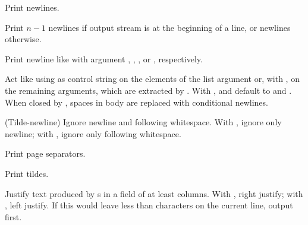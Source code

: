 \begin{LIST}{1cm}
\begin{LIST}{.5cm}
    {
    Print  newlines.
  }

    {
    Print $n-1$ newlines if output stream is at the
    beginning of a line, or  newlines otherwise.
  }

    {
    Print newline like  with argument
    , , , or , respectively.
  }

  {
  Act like  using  as 
  control string on the elements of the list argument or, with ,
  on the remaining arguments, which are extracted by
  . With \KWD{:},  and 
  default to \LIT{(} and \LIT{)}. When closed by
  , spaces in body are replaced with
  conditional newlines. 
  }

    {
    (Tilde-newline) Ignore newline and following
    whitespace. With \kwd{:}, ignore only newline; with ,
    ignore only following whitespace.
  }

    {
    Print  page separators.
  }

    {
    Print  tildes.
  }

    {
    Justify text produced by s in a field of at least
     columns. With \kwd{:}, right justify; with ,
    left justify. If this would leave less than  characters
    on the current line, output  first.
  }


\end{LIST}
\end{LIST}
